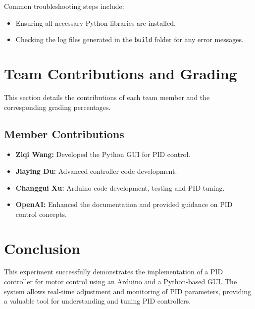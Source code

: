 \documentclass{article}
\begin{document}
Common troubleshooting steps include:
\begin{itemize}
    \item Ensuring all necessary Python libraries are installed.
    \item Checking the log files generated in the \texttt{build} folder for any error messages.
\end{itemize}

\section{Team Contributions and Grading}
This section details the contributions of each team member and the corresponding grading percentages.

\subsection{Member Contributions}
\begin{itemize}
\item \textbf{Ziqi Wang:} Developed the Python GUI for PID control.
\item \textbf{Jiaying Du:} Advanced controller code development.
\item \textbf{Changgui Xu:} Arduino code development, testing and PID tuning.
\item \textbf{OpenAI:} Enhanced the documentation and provided guidance on PID control concepts.
\end{itemize}

\section{Conclusion}
This experiment successfully demonstrates the implementation of a PID controller for motor control using an Arduino and a Python-based GUI. The system allows real-time adjustment and monitoring of PID parameters, providing a valuable tool for understanding and tuning PID controllers.
\end{document}
